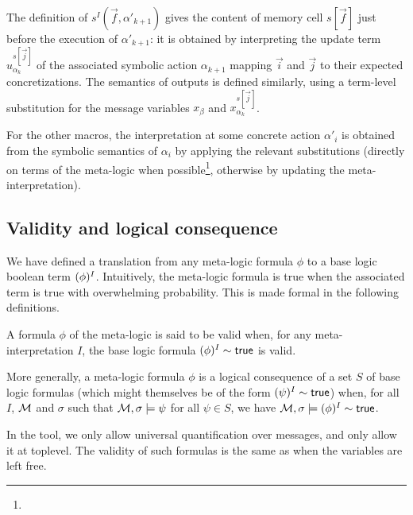 The definition of $s^I(\vec{f},\alpha'_{k+1})$ gives the content of memory
cell $s[\vec{f}]$ just before the execution of $\alpha'_{k+1}$:
it is obtained by interpreting the update term $u_{\alpha_k}^{s[\vec{j}]}$
of the associated symbolic action $\alpha_{k+1}$ mapping $\vec{i}$
and $\vec{j}$ to their expected concretizations.
The semantics of outputs is defined similarly, using a term-level
substitution for the message variables $x_\beta$ and 
$x_{\alpha_k}^{s[\vec{j}]}$.



    For the other macros, the interpretation at some concrete
    action $\alpha'_i$ is obtained from the symbolic semantics of
    $\alpha_i$ by applying the relevant substitutions (directly
    on terms of the meta-logic when possible\footnote{
    }, otherwise by updating the meta-interpretation).


\subsection{Validity and logical consequence}

We have defined a translation from any meta-logic formula $\phi$
to a base logic boolean term $(\phi)^I$. Intuitively, the
meta-logic formula is true when the associated term is true with
overwhelming probability. This is made formal in the following
definitions.

\begin{definition}
  A formula $\phi$ of the meta-logic is said to be valid when,
  for any meta-interpretation $I$, the base logic formula
  $(\phi)^{I} \sim \textsf{true}$ is valid.

  More generally, a meta-logic formula $\phi$ is a
  logical consequence of a set $S$ of base logic formulas
  (which might themselves be of the form $(\psi)^I \sim \textsf{true}$)
  when, for all $I$, $\mathcal{M}$ and $\sigma$ such that
  $\mathcal{M},\sigma \models \psi$ for all $\psi\in S$,
  we have
  $\mathcal{M},\sigma \models(\phi)^{I}\sim\mathsf{true}$.
\end{definition}

\begin{remark}
  In the tool, we only allow universal quantification over messages, and
  only allow it at toplevel. The validity of such formulas is the same as
  when the variables are left free.
\end{remark}

